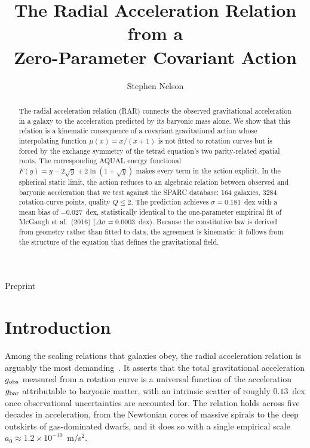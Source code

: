 \documentclass[twocolumn]{iopjournal}
\renewcommand{\articletype}[1]{%
  {\vspace*{-8mm}\noindent \Large \sf Preprint}\par
  \vspace*{6mm}\noindent{\scriptsize \sf{\bfseries \MakeUppercase{#1}}}}
\begin{document}
\articletype{Letter}

\title{The Radial Acceleration Relation from a\\
Zero-Parameter Covariant Action}

\author{Stephen Nelson}




\begin{abstract}
The radial acceleration relation (RAR) connects the observed
gravitational acceleration in a galaxy to the acceleration
predicted by its baryonic mass alone.  We show that this relation
is a kinematic consequence of a covariant gravitational action
whose interpolating function $\mu(x) = x/(x+1)$ is not fitted
to rotation curves but is forced by the exchange symmetry of the
tetrad equation's two parity-related spatial roots.  The
corresponding AQUAL energy functional
$F(y) = y - 2\sqrt{y} + 2\ln(1+\sqrt{y})$ makes every term in
the action explicit.  In the spherical static limit, the action
reduces to an algebraic relation between observed and baryonic
acceleration that we test against the SPARC database: 164
galaxies, 3284 rotation-curve points, quality $Q \leq 2$.  The
prediction achieves $\sigma = 0.181$~dex with a mean bias of
$-0.027$~dex, statistically identical to the one-parameter
empirical fit of McGaugh et al.\ (2016)
($\Delta\sigma = 0.0003$~dex).  Because the constitutive law is
derived from geometry rather than fitted to data, the agreement
is kinematic: it follows from the structure of the equation that
defines the gravitational field.
\end{abstract}


\section{Introduction}

Among the scaling relations that galaxies obey, the radial
acceleration relation is arguably the most
demanding~\cite{McGaugh2016,Lelli2017}.  It asserts that the
total gravitational acceleration $g_{\rm obs}$ measured from a
rotation curve is a universal function of the acceleration
$g_{\rm bar}$ attributable to baryonic matter, with an intrinsic
scatter of roughly $0.13$~dex once observational uncertainties are
accounted for.  The relation holds across five decades in
acceleration, from the Newtonian cores of massive spirals to the
deep outskirts of gas-dominated dwarfs, and it does so with a
single empirical scale $a_0 \approx 1.2 \times 10^{-10}$~m/s$^2$.
\end{document}
